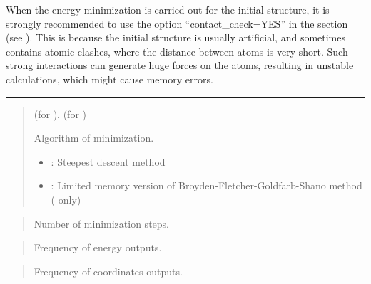 \documentclass[a4paper,11pt,oneside,english]{sphinxmanual}
\begin{document}
When the energy minimization is carried out for the initial structure,
it is strongly recommended to use the option “contact\_check=YES”
in the \sphinxstylestrong{{[}ENERGY{]}} section (see {\hyperref[\detokenize{05_Energy:energy}]{}}).
This is because the initial structure is usually artificial, and sometimes contains
atomic clashes, where the distance between atoms is very short.
Such strong interactions can generate huge forces on the atoms,
resulting in unstable calculations, which might cause memory errors.


\bigskip\hrule\bigskip


 
\begin{quote}

 (for ),  (for )

Algorithm of minimization.
\begin{itemize}
\item {} 
 : Steepest descent method

\item {} 
 : Limited memory version of Broyden-Fletcher-Goldfarb-Shano method ( only)

\end{itemize}
\end{quote}

 
\begin{quote}


Number of minimization steps.
\end{quote}

 
\begin{quote}


Frequency of energy outputs.
\end{quote}

 
\begin{quote}


Frequency of coordinates outputs.
\end{quote}
\end{document}
